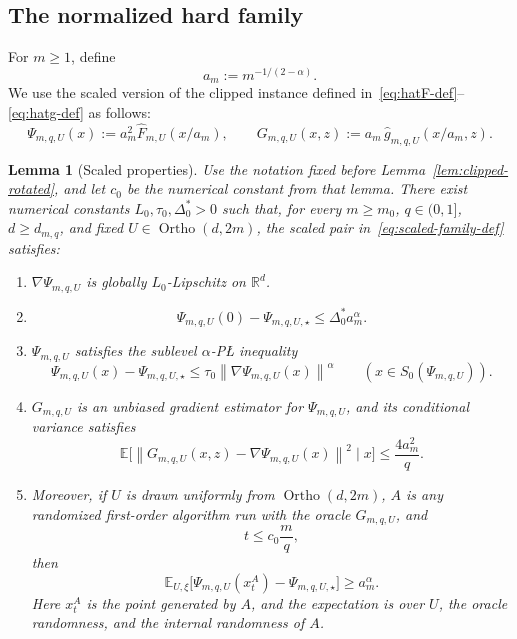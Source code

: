 \documentclass[11pt]{article}
\newtheorem{lemma}[theorem]{Lemma}
\newcommand{\R}{\mathbb{R}}
\newcommand{\E}{\mathbb{E}}
\newcommand{\norm}[1]{\left\lVert #1\right\rVert}
\newcommand{\Ortho}{\operatorname{Ortho}}
\begin{document}
\subsection{The normalized hard family}
\label{app:sto-normalized-family}

For $m\ge 1$, define
\[
a_m:=m^{-1/(2-\alpha)}.
\]
We use the scaled version of the clipped instance defined in~\eqref{eq:hatF-def}--\eqref{eq:hatg-def} as follows:
\begin{equation}
\label{eq:scaled-family-def}
\Psi_{m,q,U}(x):=a_m^2\widehat F_{m,U}(x/a_m),
\qquad
G_{m,q,U}(x,z):=a_m\,\widehat g_{m,q,U}(x/a_m,z).
\end{equation}

\begin{lemma}[Scaled properties]
\label{lem:scaled-properties}
Use the notation fixed before Lemma~\ref{lem:clipped-rotated}, and let \(c_0\) be the numerical constant from that
lemma. There exist numerical constants \(L_0,\tau_0,\Delta_0^\ast>0\) such that, for every \(m\ge m_0\),
\(q\in(0,1]\), \(d\ge d_{m,q}\), and fixed \(U\in\Ortho(d,2m)\), the scaled pair
in~\eqref{eq:scaled-family-def} satisfies:
\begin{enumerate}[label=\arabic*.,leftmargin=1.5em]
    \item $\nabla \Psi_{m,q,U}$ is globally $L_0$-Lipschitz on $\R^d$.
    \item
    \[
    \Psi_{m,q,U}(0)-\Psi_{m,q,U,\star}\le \Delta_0^\ast a_m^\alpha.
    \]
    \item $\Psi_{m,q,U}$ satisfies the sublevel $\alpha$-P\L{} inequality
    \[
    \Psi_{m,q,U}(x)-\Psi_{m,q,U,\star}\le \tau_0\norm{\nabla \Psi_{m,q,U}(x)}^\alpha
    \qquad
    (x\in S_0(\Psi_{m,q,U})).
    \]
    \item \(G_{m,q,U}\) is an unbiased gradient estimator for \(\Psi_{m,q,U}\), and its conditional variance satisfies
    \[
    \E\bigl[\norm{G_{m,q,U}(x,z)-\nabla \Psi_{m,q,U}(x)}^2\mid x\bigr]\le
    \frac{4a_m^2}{q}.
    \]
    \item Moreover, if \(U\) is drawn uniformly from \(\Ortho(d,2m)\), \(A\) is any randomized first-order algorithm run with the
    oracle \(G_{m,q,U}\), and
    \[
    t\le c_0\frac{m}{q},
    \]
    then
    \[
    \E_{U,\xi}\bigl[\Psi_{m,q,U}(x_t^A)-\Psi_{m,q,U,\star}\bigr]\ge a_m^\alpha.
    \]
    Here \(x_t^A\) is the point generated by \(A\), and the expectation is over \(U\), the oracle randomness, and the
    internal randomness of \(A\).
\end{enumerate}
\end{lemma}
\end{document}

